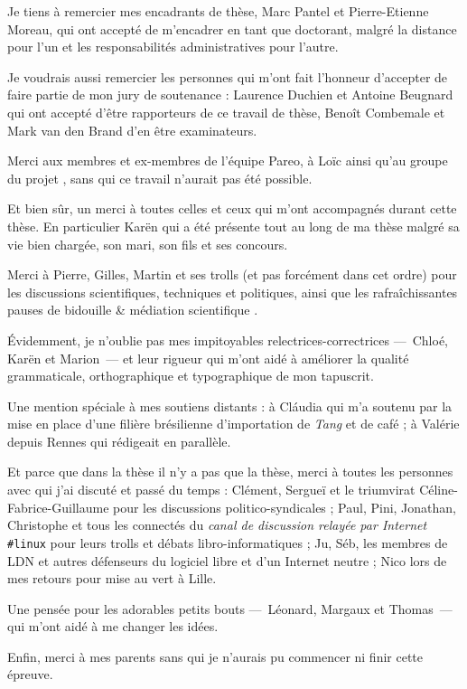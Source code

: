 
Je tiens à remercier mes encadrants de thèse, Marc Pantel et Pierre-Etienne
Moreau, qui ont accepté de m'encadrer en tant que doctorant, malgré la distance
pour l'un et les responsabilités administratives pour l'autre.


Je voudrais aussi remercier les personnes qui m'ont fait l'honneur d'accepter
de faire partie de mon jury de soutenance : Laurence Duchien et Antoine
Beugnard qui ont accepté d'être rapporteurs de ce travail de thèse, Benoît
Combemale et Mark van den Brand d'en être examinateurs.


Merci aux membres et ex-membres de l'équipe Pareo, à Loïc ainsi qu'au groupe du
projet {\quarteft}, sans qui ce travail n'aurait pas été possible.


Et bien sûr, un merci à toutes celles et ceux qui m'ont accompagnés durant
cette thèse. En particulier Karën qui a été présente tout au long de ma thèse
malgré sa vie bien chargée, son mari, son fils et ses concours. 

Merci à Pierre, Gilles, Martin et ses trolls (et pas forcément dans cet ordre)
pour les discussions scientifiques, techniques et politiques, ainsi que les
rafraîchissantes pauses de \og bidouille \& médiation scientifique \fg.

Évidemment, je n'oublie pas mes impitoyables relectrices-correctrices
---~Chloé, Karën et Marion~--- et leur rigueur qui m'ont aidé à améliorer la
qualité grammaticale, orthographique et typographique de mon tapuscrit.

Une mention spéciale à mes soutiens distants : à Cláudia qui m'a soutenu par la
mise en place d'une filière brésilienne d'importation de \textit{Tang} et de
café ; à Valérie depuis Rennes qui rédigeait en parallèle.

Et parce que dans la thèse il n'y a pas que la thèse, merci à toutes les
personnes avec qui j'ai discuté et passé du temps : Clément, Sergueï et le
triumvirat Céline-Fabrice-Guillaume pour les discussions politico-syndicales ;
Paul, Pini, Jonathan, Christophe et tous les connectés du \textit{canal de
discussion relayée par Internet} \texttt{\#linux} pour leurs trolls et débats
libro-informatiques ; Ju, Séb, les membres de LDN et autres défenseurs du
logiciel libre et d'un Internet neutre ; Nico lors de mes retours pour mise au
vert à Lille.

Une pensée pour les adorables petits bouts ---~Léonard, Margaux et Thomas~---
qui m'ont aidé à me changer les idées.


Enfin, merci à mes parents sans qui je n'aurais pu commencer ni finir cette
épreuve.
